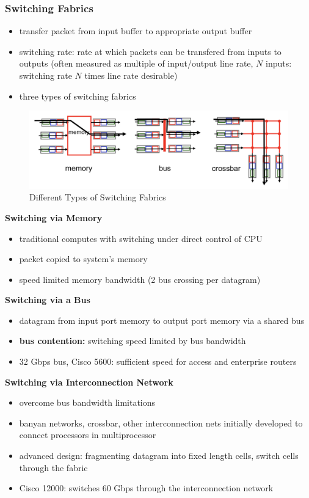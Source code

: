 \subsubsection{Switching Fabrics}
\begin{itemize}
	\item transfer packet from input buffer to appropriate output buffer
	\item switching rate: rate at which packets can be transfered from inputs to outputs (often measured as multiple of input/output line rate, $N$ inputs: switching rate $N$ times line rate desirable)
	\item three types of switching fabrics
\end{itemize}
\begin{figure}[H]
	\includegraphics[width=\linewidth]{switching}
	\centering
	\caption{Different Types of Switching Fabrics}
\end{figure}
\textbf{Switching via Memory}
\begin{itemize}
	\item traditional computes with switching under direct control of CPU
	\item packet copied to system's memory
	\item speed limited memory bandwidth (2 bus crossing per datagram)
\end{itemize}
\textbf{Switching via a Bus}
\begin{itemize}
	\item datagram from input port memory to output port memory via a shared bus
	\item \textbf{bus contention:} switching speed limited by bus bandwidth
	\item 32 Gbps bus, Cisco 5600: sufficient speed for access and enterprise routers
\end{itemize}
\textbf{Switching via Interconnection Network}
\begin{itemize}
	\item overcome bus bandwidth limitations
	\item banyan networks, crossbar, other interconnection nets initially developed to connect processors in multiprocessor
	\item advanced design: fragmenting datagram into fixed length cells, switch cells through the fabric
	\item Cisco 12000: switches 60 Gbps through the interconnection network
\end{itemize}
